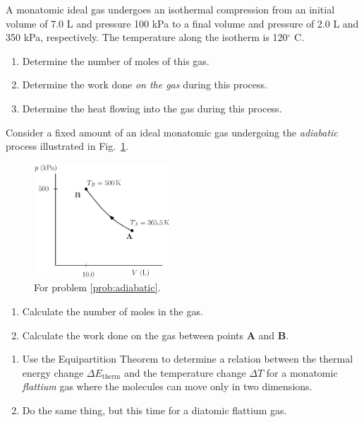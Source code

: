 \begin{problem}
A monatomic ideal gas undergoes an isothermal compression from an initial
volume of 7.0 L and pressure 100 kPa to a final volume and pressure
of 2.0 L and 350 kPa, respectively. The temperature along the isotherm
is 120$^\circ$ C.
\begin{enumerate}
\item Determine the number of moles of this gas.
\item Determine the work done {\em on the gas} during this process.
\item Determine the heat flowing into the gas during this process.
\end{enumerate}
\end{problem}

\begin{problem}
Consider a fixed amount of an ideal monatomic gas undergoing the
{\em adiabatic} process illustrated in Fig.~\ref{fig:gasProcess2}.
\begin{figure}
\begin{center}
\includegraphics[width=2.0in]{gas_processes/gasProcess2.eps}
\caption{For problem \ref{prob:adiabatic}.}
\label{fig:gasProcess2}
\end{center}
\end{figure}
\begin{enumerate}
\item Calculate the number of moles in the gas.
\item Calculate the work done on the gas between points {\bf A}
and {\bf B}.
\end{enumerate}
\label{prob:adiabatic}
\end{problem}

\begin{problem}
\begin{enumerate}
\item Use the Equipartition Theorem to determine a relation between the
thermal energy change $\Delta E_\text{therm}$ and the temperature
change $\Delta T$ for a monatomic {\em flattium} gas where the
molecules can move only in two dimensions.
\item Do the same thing, but this time for a diatomic flattium gas.
\end{enumerate}
\end{problem}

